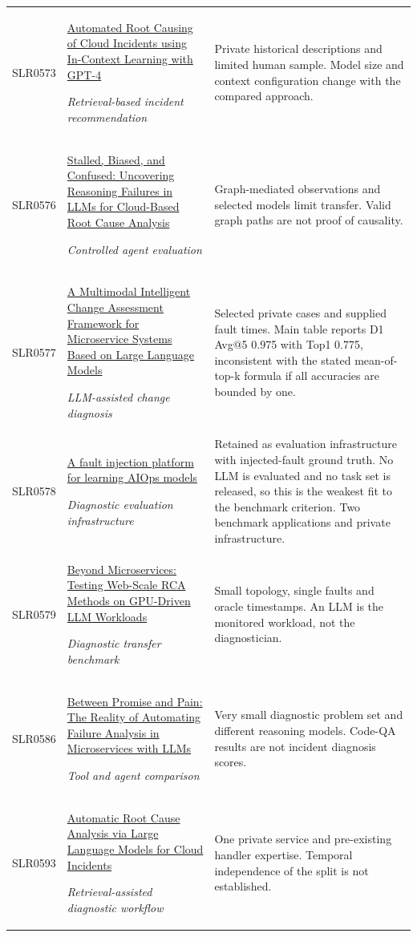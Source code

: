 \begin{longtable}{@{}p{}p{}p{}@{}}
SLR0573 & \href{https://arxiv.org/pdf/2401.13810}{Automated Root Causing of Cloud Incidents using In-Context Learning with GPT-4}\par\emph{Retrieval-based incident recommendation} & Private historical descriptions and limited human sample. Model size and context configuration change with the compared approach. \\
SLR0576 & \href{https://arxiv.org/pdf/2601.22208}{Stalled, Biased, and Confused: Uncovering Reasoning Failures in LLMs for Cloud-Based Root Cause Analysis}\par\emph{Controlled agent evaluation} & Graph-mediated observations and selected models limit transfer. Valid graph paths are not proof of causality. \\
SLR0577 & \href{https://nkcs.iops.ai/wp-content/uploads/2025/03/ChangeLLM.pdf}{A Multimodal Intelligent Change Assessment Framework for Microservice Systems Based on Large Language Models}\par\emph{LLM-assisted change diagnosis} & Selected private cases and supplied fault times. Main table reports D1 Avg@5 0.975 with Top1 0.775, inconsistent with the stated mean-of-top-k formula if all accuracies are bounded by one. \\
SLR0578 & \href{https://saurabhjha.one/pubs/ASE2022/paper.pdf}{A fault injection platform for learning AIOps models}\par\emph{Diagnostic evaluation infrastructure} & Retained as evaluation infrastructure with injected-fault ground truth. No LLM is evaluated and no task set is released, so this is the weakest fit to the benchmark criterion. Two benchmark applications and private infrastructure. \\
SLR0579 & \href{https://arxiv.org/pdf/2603.02057}{Beyond Microservices: Testing Web-Scale RCA Methods on GPU-Driven LLM Workloads}\par\emph{Diagnostic transfer benchmark} & Small topology, single faults and oracle timestamps. An LLM is the monitored workload, not the diagnostician. \\
SLR0586 & \href{https://alessandrocornacchia.github.io/assets/pdf/apsys25-llm-failure-analysis-cornacchia.pdf}{Between Promise and Pain: The Reality of Automating Failure Analysis in Microservices with LLMs}\par\emph{Tool and agent comparison} & Very small diagnostic problem set and different reasoning models. Code-QA results are not incident diagnosis scores. \\
SLR0593 & \href{https://arxiv.org/pdf/2305.15778}{Automatic Root Cause Analysis via Large Language Models for Cloud Incidents}\par\emph{Retrieval-assisted diagnostic workflow} & One private service and pre-existing handler expertise. Temporal independence of the split is not established. \\

\end{longtable}
